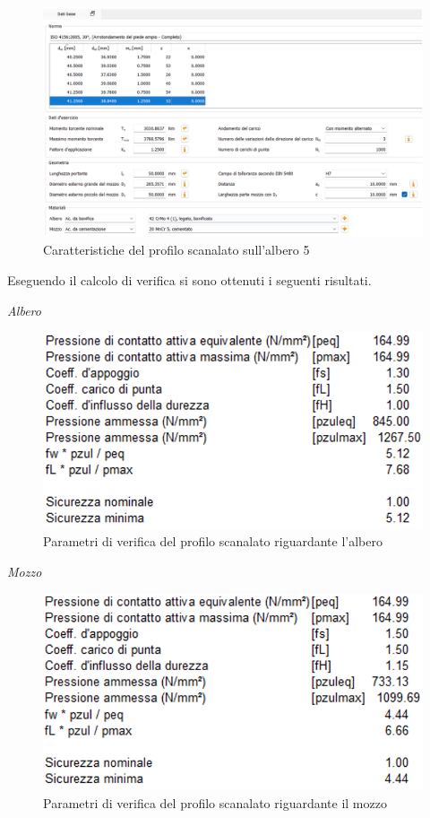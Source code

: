 \begin{figure}[h]
    \centering
    \includegraphics[scale=0.5]{Immagini/Scanalato5.png}
    \caption{Caratteristiche del profilo scanalato sull'albero 5}
    \label{fig:Scanalato5}
\end{figure}

Eseguendo il calcolo di verifica si sono ottenuti i seguenti risultati.

\emph{Albero}
\begin{figure}[h]
    \centering
    \includegraphics[scale=0.5]{Immagini/RisultatiScanalatoAlbero5.png}
    \caption{Parametri  di verifica del profilo scanalato riguardante l'albero}
    \label{fig:RisultatiScanalatoAlbero5}
\end{figure}
\newpage
\emph{Mozzo}
\begin{figure}[h]
    \centering
    \includegraphics[scale=0.5]{Immagini/RisultatiScanalatoMozzo5.png}
    \caption{Parametri di verifica del profilo scanalato riguardante il mozzo}
    \label{fig:RisultatiScanalatoMozzo5}
\end{figure}

